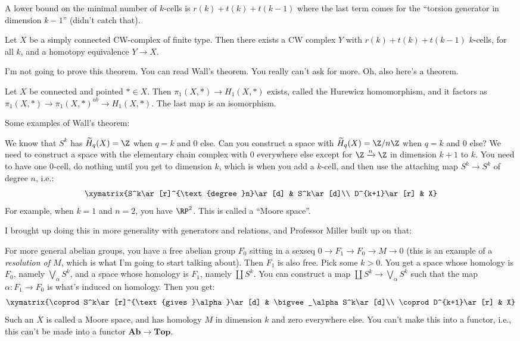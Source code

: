 A lower bound on the minimal number of $k$-cells is $r(k)+t(k)+t(k-1)$ where the last term comes for the ``torsion generator in dimension $k-1$'' (didn't catch that).
\begin{theorem}[Wall]
Let $X$ be a simply connected CW-complex of finite type. Then there exists a CW complex $Y$ with $r(k)+t(k)+t(k-1)$ $k$-cells, for all $k$, and a homotopy equivalence $Y\to X$.
\end{theorem}
I'm not going to prove this theorem. You can read Wall's theorem. You really can't ask for more. Oh, also here's a theorem.
\begin{theorem}
Let $X$ be connected and pointed $\ast\in X$. Then $\pi_1(X,\ast)\to H_1(X,\ast)$ exists, called the Hurewicz homomorphism, and it factors as $\pi_1(X,\ast)\to \pi_1(X,\ast)^{ab}\to H_1(X,\ast)$. The last map is an isomorphism.
\end{theorem}
Some examples of Wall's theorem:
\begin{example}
We know that $S^k$ has $\widetilde{ H}_q(X)=\Z$ when $q=k$ and $0$ else. Can you construct a space with $\widetilde{ H}_q(X)=\Z/n\Z$ when $q=k$ and $0$ else? We need to construct a space with the elementary chain complex with $0$ everywhere else except for $\Z\xrightarrow{n}\Z$ in dimension $k+1$ to $k$. You need to have one $0$-cell, do nothing until you get to dimension $k$, which is when you add a $k$-cell, and then use the attaching map $S^k\to S^k$ of degree $n$, i.e.:
\begin{equation*}
\xymatrix{S^k\ar[r]^{\text{degree }n}\ar[d] & S^k\ar[d]\\
D^{k+1}\ar[r] & X}
\end{equation*}
For example, when $k=1$ and $n=2$, you have $\RP^2$. This is called a ``Moore space''.
\end{example}
I brought up doing this in more generality with generators and relations, and Professor Miller built up on that:
\begin{example}
For more general abelian groups, you have a free abelian group $F_0$ sitting in a sexseq $0\to F_1\to F_0\to M\to 0$ (this is an example of a \emph{resolution of $M$}, which is what I'm going to start talking about). Then $F_1$ is also free. Pick some $k>0$. You get a space whose homology is $F_0$, namely $\bigvee_\alpha S^k$, and a space whose homology is $F_1$, namely $\coprod S^k$. You can construct a map $\coprod S^k\to \bigvee_\alpha S^k$ such that the map $\alpha:F_1\to F_0$ is what's induced on homology. Then you get:
\begin{equation*}
\xymatrix{\coprod S^k\ar[r]^{\text{gives }\alpha}\ar[d] & \bigvee_\alpha S^k\ar[d]\\
\coprod D^{k+1}\ar[r] & X}
\end{equation*}
Such an $X$ is called a Moore space, and has homology $M$ in dimension $k$ and zero everywhere else. You can't make this into a functor, i.e., this can't be made into a functor $\mathbf{Ab}\to\mathbf{Top}$.
\end{example}
